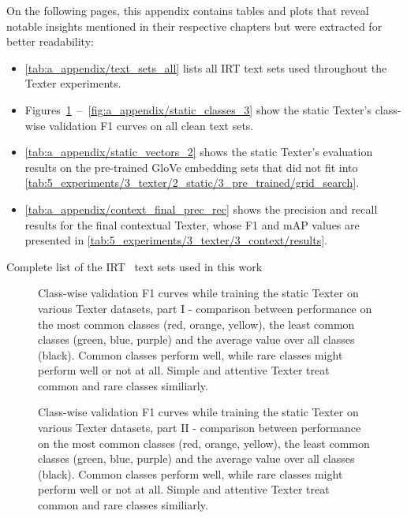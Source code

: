 On the following pages, this appendix contains tables and plots that reveal notable insights mentioned in their respective chapters but were extracted for better readability:

\begin{itemize}
    \item \autoref{tab:a_appendix/text_sets_all} lists all IRT text sets used throughout the Texter experiments.

    \item Figures~\ref{fig:a_appendix/static_classes_1}~--~\ref{fig:a_appendix/static_classes_3} show the static Texter's class-wise validation F1 curves on all clean text sets.

    \item \autoref{tab:a_appendix/static_vectors_2} shows the static Texter's evaluation results on the pre-trained GloVe embedding sets that did not fit into \autoref{tab:5_experiments/3_texter/2_static/3_pre_trained/grid_search}.

    \item \autoref{tab:a_appendix/context_final_prec_rec} shows the precision and recall results for the final contextual Texter, whose F1 and mAP values are presented in \autoref{tab:5_experiments/3_texter/3_context/results}.
\end{itemize}

\begin{table}
    \makebox[\textwidth][c]{
        
    }
    \caption{Complete list of the IRT~\cite{IRT} text sets used in this work}
    \label{tab:a_appendix/text_sets_all}
\end{table}

\begin{figure}
    \centering
    
    \caption{Class-wise validation F1 curves while training the static Texter on various Texter datasets, part I - comparison between performance on the most common classes (red, orange, yellow), the least common classes (green, blue, purple) and the average value over all classes (black). Common classes perform well, while rare classes might perform well or not at all. Simple and attentive Texter treat common and rare classes similiarly.}
    \label{fig:a_appendix/static_classes_1}
\end{figure}

\begin{figure}
    \centering
    
    \caption{Class-wise validation F1 curves while training the static Texter on various Texter datasets, part II - comparison between performance on the most common classes (red, orange, yellow), the least common classes (green, blue, purple) and the average value over all classes (black). Common classes perform well, while rare classes might perform well or not at all. Simple and attentive Texter treat common and rare classes similiarly.}
    \label{fig:a_appendix/static_classes_2}
\end{figure}

